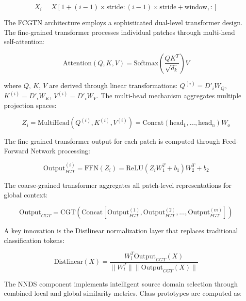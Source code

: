 \documentclass[journal]{IEEEtran}
\begin{document}
\begin{equation}
X_i = X[1 + (i-1) \times \text{stride} : (i-1) \times \text{stride} + \text{window}, :]
\label{eq:cdfi_sliding_window}
\end{equation}

The FCGTN architecture employs a sophisticated dual-level transformer design. The fine-grained transformer processes individual patches through multi-head self-attention:

\begin{equation}
\text{Attention}(Q, K, V) = \text{Softmax}\left(\frac{QK^T}{\sqrt{d_k}}\right)V
\label{eq:cdfi_attention}
\end{equation}

where $Q$, $K$, $V$ are derived through linear transformations: $Q^{(i)} = D'_i W_Q$, $K^{(i)} = D'_i W_K$, $V^{(i)} = D'_i W_V$. The multi-head mechanism aggregates multiple projection spaces:

\begin{equation}
Z_i = \text{MultiHead}(Q^{(i)}, K^{(i)}, V^{(i)}) = \text{Concat}(\text{head}_1, \ldots, \text{head}_n)W_o
\label{eq:cdfi_multihead}
\end{equation}

The fine-grained transformer output for each patch is computed through Feed-Forward Network processing:

\begin{equation}
\text{Output}^{(i)}_{FGT} = \text{FFN}(Z_i) = \text{ReLU}(Z_i W_1^T + b_1) W_2^T + b_2
\label{eq:cdfi_fgt_output}
\end{equation}

The coarse-grained transformer aggregates all patch-level representations for global context:

\begin{equation}
\text{Output}_{CGT} = \text{CGT}(\text{Concat}[\text{Output}^{(1)}_{FGT}, \text{Output}^{(2)}_{FGT}, \ldots, \text{Output}^{(m)}_{FGT}])
\label{eq:cdfi_cgt_output}
\end{equation}

A key innovation is the Distlinear normalization layer that replaces traditional classification tokens:

\begin{equation}
\text{Distlinear}(X) = \frac{W_l^T \text{Output}_{CGT}(X)}{\|W_l^T\| \|\text{Output}_{CGT}(X)\|}
\label{eq:cdfi_distlinear}
\end{equation}

The NNDS component implements intelligent source domain selection through combined local and global similarity metrics. Class prototypes are computed as:
\end{document}
